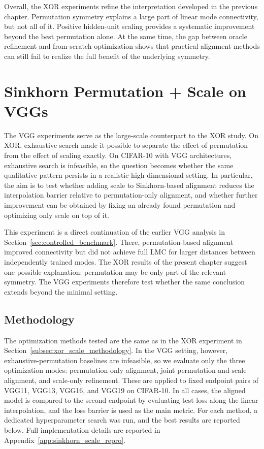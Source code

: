 \documentclass[11pt,a4paper]{report}
\begin{document}
Overall, the XOR experiments refine the interpretation developed in the previous chapter. Permutation symmetry explains a large part of linear mode connectivity, but not all of it. Positive hidden-unit scaling provides a systematic improvement beyond the best permutation alone. At the same time, the gap between oracle refinement and from-scratch optimization shows that practical alignment methods can still fail to realize the full benefit of the underlying symmetry.

\section{Sinkhorn Permutation + Scale on VGGs}

The VGG experiments serve as the large-scale counterpart to the XOR study. On XOR, exhaustive search made it possible to separate the effect of permutation from the effect of scaling exactly. On CIFAR-10 with VGG architectures, exhaustive search is infeasible, so the question becomes whether the same qualitative pattern persists in a realistic high-dimensional setting. In particular, the aim is to test whether adding scale to Sinkhorn-based alignment reduces the interpolation barrier relative to permutation-only alignment, and whether further improvement can be obtained by fixing an already found permutation and optimizing only scale on top of it.

This experiment is a direct continuation of the earlier VGG analysis in Section~\ref{sec:controlled_benchmark}. There, permutation-based alignment improved connectivity but did not achieve full LMC for larger distances between independently trained modes. The XOR results of the present chapter suggest one possible explanation: permutation may be only part of the relevant symmetry. The VGG experiments therefore test whether the same conclusion extends beyond the minimal setting.

\subsection{Methodology}

The optimization methods tested are the same as in the XOR experiment in Section~\ref{subsec:xor_scale_methodology}. In the VGG setting, however, exhaustive-permutation baselines are infeasible, so we evaluate only the three optimization modes: permutation-only alignment, joint permutation-and-scale alignment, and scale-only refinement. These are applied to fixed endpoint pairs of VGG11, VGG13, VGG16, and VGG19 on CIFAR-10. In all cases, the aligned model is compared to the second endpoint by evaluating test loss along the linear interpolation, and the loss barrier is used as the main metric. For each method, a dedicated hyperparameter search was run, and the best results are reported below. Full implementation details are reported in Appendix~\ref{app:sinkhorn_scale_repro}.
\end{document}
